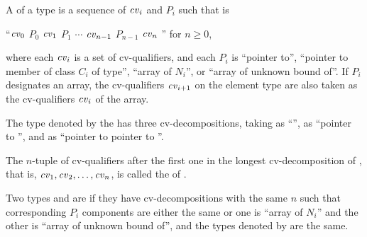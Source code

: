 %
\pnum
A  of a type 
is a sequence of
$\cv{}_i$ and $P_i$
such that  is
\begin{indented}
``$\cv{}_0$ $P_0$ $\cv{}_1$ $P_1$ $\cdots$ $\cv{}_{n-1}$ $P_{n-1}$ $\cv{}_n$ '' for $n \geq 0$,
\end{indented}
where
each $\cv{}_i$ is a set of cv-qualifiers, and
each $P_i$ is
``pointer to'',
``pointer to member of class $C_i$ of type'',
``array of $N_i$'', or
``array of unknown bound of''.
If $P_i$ designates an array,
the cv-qualifiers $\cv{}_{i+1}$ on the element type are also taken as
the cv-qualifiers $\cv{}_i$ of the array.
\begin{example}
The type denoted by the  
has three cv-decompositions,
taking 
as ``'',
as ``pointer to '', and
as ``pointer to pointer to ''.
\end{example}
The $n$-tuple of cv-qualifiers after the first one
in the longest cv-decomposition of , that is,
$\cv{}_1, \cv{}_2, \dotsc, \cv{}_n$, is called the
 of .

\pnum
{}%
Two types  and  are  if
they have cv-decompositions with the same $n$
such that corresponding $P_i$ components are either the same
or one is ``array of $N_i$'' and the other is ``array of unknown bound of'',
and the types denoted by  are the same.

